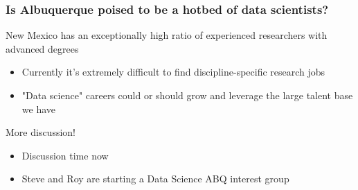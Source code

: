 
\begin{frame}
\frametitle{Is Albuquerque poised to be a hotbed of data scientists?}
\begin{center}

\begin{block}{New Mexico has an exceptionally high ratio of experienced researchers with advanced degrees}
\begin{itemize}
    \item Currently it's extremely difficult to find discipline-specific research jobs
	\item "Data science" careers could or should grow and leverage the large talent base we have 
\end{itemize}
\end{block}

\begin{exampleblock}{More discussion!}
\begin{itemize}
    \item Discussion time now
	\item Steve and Roy are starting a Data Science ABQ interest group
\end{itemize}
\end{exampleblock}



\end{center}
\end{frame}

